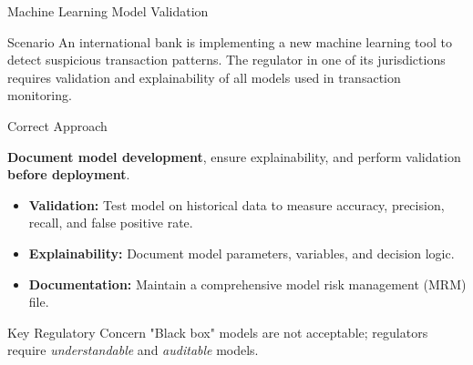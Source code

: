 \documentclass{beamer}
\begin{document}
	\begin{frame}{Machine Learning Model Validation}
		\begin{block}{Scenario}
			An international bank is implementing a new machine learning tool to detect suspicious transaction patterns. The regulator in one of its jurisdictions requires validation and explainability of all models used in transaction monitoring.
		\end{block}
		\begin{block}{Correct Approach}
			\begin{center}
				\textbf{Document model development}, ensure explainability, and perform validation \textbf{before deployment}.
			\end{center}
			\begin{itemize}
				\item \textbf{Validation:} Test model on historical data to measure accuracy, precision, recall, and false positive rate.
				\item \textbf{Explainability:} Document model parameters, variables, and decision logic.
				\item \textbf{Documentation:} Maintain a comprehensive model risk management (MRM) file.
			\end{itemize}
		\end{block}
		\begin{alertblock}{Key Regulatory Concern}
			"Black box" models are not acceptable; regulators require \textit{understandable} and \textit{auditable} models.
		\end{alertblock}
	\end{frame}
	
\end{document}
